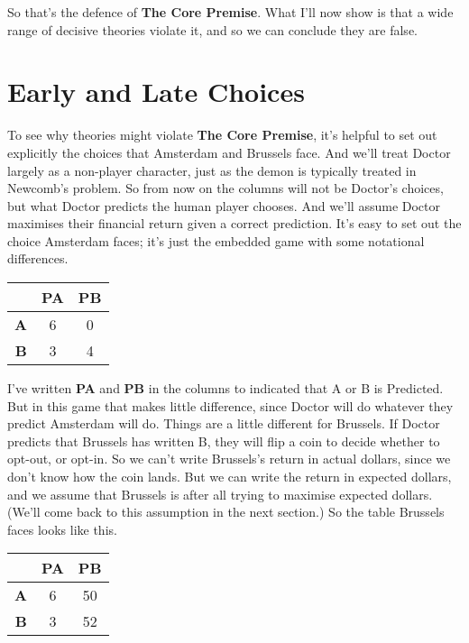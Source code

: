 \documentclass[
  12pt,
]{article}
\begin{document}
So that's the defence of \textbf{The Core Premise}. What I'll now show
is that a wide range of decisive theories violate it, and so we can
conclude they are false.

\hypertarget{early-and-late-choices}{%
\section{Early and Late Choices}\label{early-and-late-choices}}

To see why theories might violate \textbf{The Core Premise}, it's
helpful to set out explicitly the choices that Amsterdam and Brussels
face. And we'll treat Doctor largely as a non-player character, just as
the demon is typically treated in Newcomb's problem. So from now on the
columns will not be Doctor's choices, but what Doctor predicts the human
player chooses. And we'll assume Doctor maximises their financial return
given a correct prediction. It's easy to set out the choice Amsterdam
faces; it's just the embedded game with some notational differences.

\begin{table}[H]
\centering
\begin{tabular}[t]{>{}r|cc}

\textbf{ } & \textbf{PA} & \textbf{PB}\\
\midrule
\textbf{A} & 6 & 0\\
\textbf{B} & 3 & 4\\

\end{tabular}
\end{table}

I've written \textbf{PA} and \textbf{PB} in the columns to indicated
that A or B is Predicted. But in this game that makes little difference,
since Doctor will do whatever they predict Amsterdam will do. Things are
a little different for Brussels. If Doctor predicts that Brussels has
written B, they will flip a coin to decide whether to opt-out, or
opt-in. So we can't write Brussels's return in actual dollars, since we
don't know how the coin lands. But we can write the return in expected
dollars, and we assume that Brussels is after all trying to maximise
expected dollars. (We'll come back to this assumption in the next
section.) So the table Brussels faces looks like this.

\begin{table}[H]
\centering
\begin{tabular}[t]{>{}r|cc}

\textbf{ } & \textbf{PA} & \textbf{PB}\\
\midrule
\textbf{A} & 6 & 50\\
\textbf{B} & 3 & 52\\

\end{tabular}
\end{table}
\end{document}
